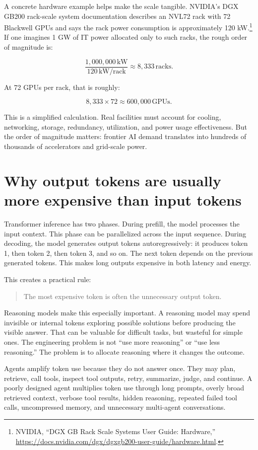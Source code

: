 A concrete hardware example helps make the scale tangible. NVIDIA's DGX GB200 rack-scale system documentation describes an NVL72 rack with 72 Blackwell GPUs and says the rack power consumption is approximately 120 kW.\footnote{NVIDIA, ``DGX GB Rack Scale Systems User Guide: Hardware,'' \url{https://docs.nvidia.com/dgx/dgxgb200-user-guide/hardware.html}.} If one imagines 1 GW of IT power allocated only to such racks, the rough order of magnitude is:

\[
\frac{1{,}000{,}000\,\text{kW}}{120\,\text{kW/rack}} \approx 8{,}333\,\text{racks}.
\]

At 72 GPUs per rack, that is roughly:

\[
8{,}333 \times 72 \approx 600{,}000\,\text{GPUs}.
\]

This is a simplified calculation. Real facilities must account for cooling, networking, storage, redundancy, utilization, and power usage effectiveness. But the order of magnitude matters: frontier AI demand translates into hundreds of thousands of accelerators and grid-scale power.

\section{Why output tokens are usually more expensive than input tokens}

Transformer inference has two phases. During prefill, the model processes the input context. This phase can be parallelized across the input sequence. During decoding, the model generates output tokens autoregressively: it produces token 1, then token 2, then token 3, and so on. The next token depends on the previous generated tokens. This makes long outputs expensive in both latency and energy.

This creates a practical rule:

\begin{quote}
The most expensive token is often the unnecessary output token.
\end{quote}

Reasoning models make this especially important. A reasoning model may spend invisible or internal tokens exploring possible solutions before producing the visible answer. That can be valuable for difficult tasks, but wasteful for simple ones. The engineering problem is not ``use more reasoning'' or ``use less reasoning.'' The problem is to allocate reasoning where it changes the outcome.

Agents amplify token use because they do not answer once. They may plan, retrieve, call tools, inspect tool outputs, retry, summarize, judge, and continue. A poorly designed agent multiplies token use through long prompts, overly broad retrieved context, verbose tool results, hidden reasoning, repeated failed tool calls, uncompressed memory, and unnecessary multi-agent conversations.


